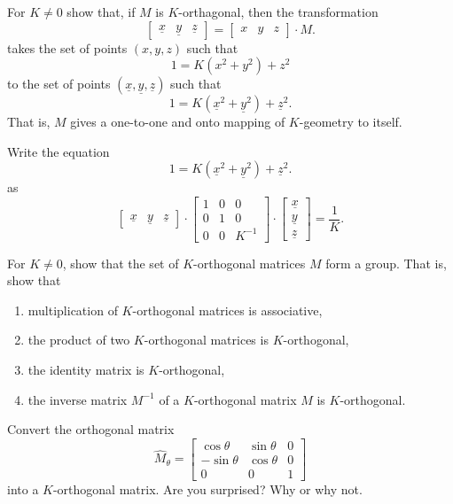 \documentclass{ximera}
\begin{document}
\begin{problem}
  For $K\ne 0$ show that, if $M$ is $K$-orthagonal, then the transformation
  \[
  \begin{bmatrix}
    \underline{x} & \underline{y} & \underline{z}
  \end{bmatrix}
  =
  \begin{bmatrix}
    x & y & z
  \end{bmatrix}
  \cdot M.
  \]
  takes the set of points $\left(x,y,z\right)$ such
  that
\[
1 = K\left(x^2 + y^2\right) +z^2
\]
to the set of points
$\left(\underline{x},\underline{y},\underline{z}\right)$
such that
\[
1=K\left(\underline{x}^2 + \underline{y}^{2}\right) + \underline{z}^{2}.
\]
That is, $M$ gives a one-to-one and onto mapping of $K$-geometry to
itself.
\begin{hint}
  Write the equation
  \[
  1=K\left(\underline{x}^2 + \underline{y}^{2}\right) + \underline{z}^{2}.
  \]
  as
\[
\begin{bmatrix}
\underline{x} & \underline{y} & \underline{z}%
\end{bmatrix}  \cdot\begin{bmatrix}
1 & 0 & 0\\
0 & 1 & 0\\
0 & 0 & K^{-1}%
\end{bmatrix}  \cdot
\begin{bmatrix}
\underline{x}\\
\underline{y}\\
\underline{z}%
\end{bmatrix}  =\frac{1}{K}.
\]
\end{hint}
\end{problem}




\begin{problem}
For $K\neq0$, show that the set of $K$-orthogonal matrices $M$ form a
group.  That is, show that
\begin{enumerate}
\item multiplication of $K$-orthogonal matrices is associative, 
\item the product of two $K$-orthogonal matrices is $K$-orthogonal,
\item the identity matrix is $K$-orthogonal,
\item the inverse matrix $M^{-1}$ of a $K$-orthogonal matrix $M$ is $K$-orthogonal.
\end{enumerate}
\end{problem}

\begin{problem}
  Convert the orthogonal matrix
  \[
  \hat{M}_\theta=\begin{bmatrix}
  \cos\theta & \sin\theta & 0\\
  -\sin\theta & \cos\theta & 0\\
  0 & 0 & 1
  \end{bmatrix}
  \]
  into a $K$-orthogonal matrix. Are you surprised? Why or why not.
\end{problem}
\end{document}
